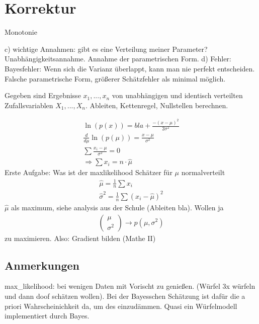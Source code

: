 \setcounter{chapter}{3}
\chapter{Korrektur}

\begin{aufgabe}
\end{aufgabe}

Monotonie

c) wichtige Annahmen: gibt es eine Verteilung meiner Parameter? Unabhängigkeitsannahme. Annahme der parametrischen Form.
d) Fehler: Bayesfehler: Wenn sich die Varianz überlappt, kann man nie perfekt entscheiden. Falsche parametrische Form, größerer Schätzfehler als minimal möglich.

\begin{aufgabe}
\end{aufgabe}

Gegeben sind Ergebnisse $x_1,...,x_n$ von unabhängigen und identisch verteilten Zufallsvariablen $X_1,...,X_n$. 
Ableiten, Kettenregel, Nullstellen berechnen.

\begin{align*}
\ln(p(x))=
bla+\frac{-(x-\mu)^2}{2\sigma^2}\\
\frac{d}{d\mu} \ln(p(\mu)) = \frac{x-\mu}{\sigma^2}\\
\sum \frac{x_i - \mu}{\sigma^2} = 0\\
\Rightarrow \sum x_i = n\cdot \hat{\mu}
\end{align*}
Erste Aufgabe: Was ist der maxlikelihood Schätzer für $\mu$ normalverteilt
\begin{align*}
\hat{\mu} = \frac{1}{n} \sum x_i\\
\hat{\sigma}^2 = \frac{1}{n} \sum (x_i - \hat{\mu})^2
\end{align*}
$\hat{\mu}$ als maximum, siehe analysis aus der Schule (Ableiten bla). Wollen ja
\begin{align*}
\begin{pmatrix}\mu \\
\sigma ^2
\end{pmatrix} \to p(\mu,\sigma^2)
\end{align*}
zu maximieren. Also: Gradient bilden (Mathe II)
\section{Anmerkungen}
max\_likelihood: bei wenigen Daten mit Vorischt zu genießen. (Würfel 3x würfeln und dann doof schätzen wollen). Bei der Bayesschen Schätzung ist dafür die a priori Wahrscheinichkeit da, um des einzudämmen. Quasi ein Würfelmodell implementiert durch Bayes.